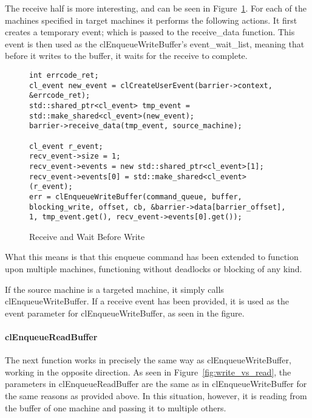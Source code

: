 \documentclass[../thesis.tex]{subfiles}
\begin{document}
            The receive half is more interesting, and can be seen in Figure~\ref{fig:receive_and_wait}. For each of the machines specified in target machines it performs the following actions. It first creates a temporary event; which is passed to the receive\_data function. This event is then used as the clEnqueueWriteBuffer's event\_wait\_list, meaning that before it writes to the buffer, it waits for the receive to complete.

            \begin{figure}[htbp]
                \centering
                \lstset{language=cpp}
                \begin{lstlisting}[tabsize=2]
int errcode_ret;
cl_event new_event = clCreateUserEvent(barrier->context, &errcode_ret);
std::shared_ptr<cl_event> tmp_event = std::make_shared<cl_event>(new_event);
barrier->receive_data(tmp_event, source_machine);

cl_event r_event;
recv_event->size = 1;
recv_event->events = new std::shared_ptr<cl_event>[1];
recv_event->events[0] = std::make_shared<cl_event>(r_event);
err = clEnqueueWriteBuffer(command_queue, buffer, blocking_write, offset, cb, &barrier->data[barrier_offset], 1, tmp_event.get(), recv_event->events[0].get());

                \end{lstlisting}
                \caption{Receive and Wait Before Write}
                \label{fig:receive_and_wait}
            \end{figure}

            What this means is that this enqueue command has been extended to function upon multiple machines, functioning without deadlocks or blocking of any kind.

            If the source machine is a targeted machine, it simply calls clEnqueueWriteBuffer. If a receive event has been provided, it is used as the event parameter for clEnqueueWriteBuffer, as seen in the figure.

        \paragraph{clEnqueueReadBuffer} %
        \label{par:clenqueuereadbuffer}
            The next function works in precisely the same way as clEnqueueWriteBuffer, working in the opposite direction. As seen in Figure~\ref{fig:write_vs_read}, the parameters in clEnqueueReadBuffer are the same as in clEnqueueWriteBuffer for the same reasons as provided above. In this situation, however, it is reading from the buffer of one machine and passing it to multiple others.
        
\end{document}
